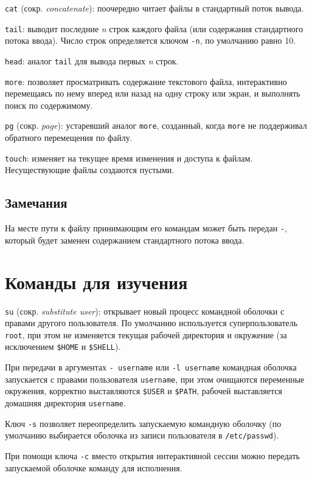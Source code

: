\documentclass[listings]{labreport}
\begin{document}
\texttt{cat} (сокр. \textit{concatenate}): поочередно читает файлы в стандартный поток вывода.

\texttt{tail}: выводит последние \textit{n} строк каждого файла (или содержания стандартного потока ввода).
Число строк определяется ключом \texttt{-n}, по умолчанию равно 10.

\texttt{head}: аналог \texttt{tail} для вывода первых \textit{n} строк.

\texttt{more}: позволяет просматривать содержание текстового файла, интерактивно перемещаясь по нему вперед
или назад на одну строку или экран, и выполнять поиск по содержимому.

\texttt{pg} (сокр. \textit{page}): устаревший аналог \texttt{more}, созданный, когда \texttt{more} не поддерживал
обратного перемещения по файлу.

\texttt{touch}: изменяет на текущее время изменения и доступа к файлам. Несуществующие файлы создаются пустыми.

\subsection*{Замечания}

На месте пути к файлу принимающим его командам может быть передан \texttt{-}, который будет заменен
содержанием стандартного потока ввода.

\section*{Команды для изучения}

\texttt{su} (сокр. \textit{substitute user}): открывает новый процесс командной оболочки с правами другого пользователя.
По умолчанию используется суперпользователь \texttt{root}, при этом не изменяется текущая рабочей директория и
окружение (за исключением \texttt{\$HOME} и \texttt{\$SHELL}).

При передачи в аргументах \texttt{- username} или \texttt{-l username} командная оболочка запускается с правами
пользователя \texttt{username}, при этом очищаются переменные окружения, корректно выставляются \texttt{\$USER} и \texttt{\$PATH},
рабочей выставляется домашняя директория \texttt{username}.

Ключ \texttt{-s} позволяет переопределить запускаемую командную оболочку
(по умолчанию выбирается оболочка из записи пользователя в \texttt{/etc/passwd}).

При помощи ключа \texttt{-c} вместо открытия интерактивной сессии можно передать запускаемой оболочке команду для исполнения.
\end{document}
